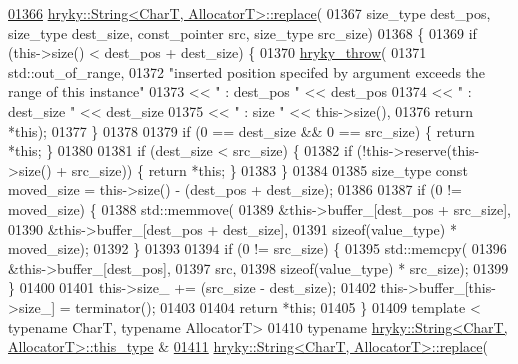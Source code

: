 \begin{DoxyCode}
\hypertarget{string_8h_source_l01366}{}\hyperlink{classhryky_1_1_string_af903fdf0a575a50bdedda445c31d376e}{01366} \hyperlink{classhryky_1_1_string}{hryky::String<CharT, AllocatorT>::replace}(
01367     size\_type dest\_pos, size\_type dest\_size, const\_pointer src, size\_type 
      src\_size)
01368 \{
01369     \textcolor{keywordflow}{if} (this->size() < dest\_pos + dest\_size) \{
01370         \hyperlink{debug__common_8h_af50606eac4009921527ddcaed392b2c2}{hryky_throw}(
01371             std::out\_of\_range,
01372             \textcolor{stringliteral}{"inserted position specifed by argument exceeds the range of this
       instance"}
01373             << \textcolor{stringliteral}{" : dest\_pos "} << dest\_pos
01374             << \textcolor{stringliteral}{" : dest\_size "} << dest\_size
01375             << \textcolor{stringliteral}{" : size "} << this->size(),
01376             \textcolor{keywordflow}{return} *\textcolor{keyword}{this});
01377     \}
01378 
01379     \textcolor{keywordflow}{if} (0 == dest\_size && 0 == src\_size) \{ \textcolor{keywordflow}{return} *\textcolor{keyword}{this}; \}
01380 
01381     \textcolor{keywordflow}{if} (dest\_size < src\_size) \{
01382         \textcolor{keywordflow}{if} (!this->reserve(this->size() + src\_size)) \{ \textcolor{keywordflow}{return} *\textcolor{keyword}{this}; \}
01383     \}
01384 
01385     size\_type \textcolor{keyword}{const} moved\_size = this->size() - (dest\_pos + dest\_size);
01386 
01387     \textcolor{keywordflow}{if} (0 != moved\_size) \{
01388         std::memmove(
01389             &this->buffer\_[dest\_pos + src\_size],
01390             &this->buffer\_[dest\_pos + dest\_size],
01391             \textcolor{keyword}{sizeof}(value\_type) * moved\_size);
01392     \}
01393 
01394     \textcolor{keywordflow}{if} (0 != src\_size) \{
01395         std::memcpy(
01396             &this->buffer\_[dest\_pos],
01397             src,
01398             \textcolor{keyword}{sizeof}(value\_type) * src\_size);
01399     \}
01400 
01401     this->size\_ += (src\_size - dest\_size);
01402     this->buffer\_[this->size\_] = terminator();
01403 
01404     \textcolor{keywordflow}{return} *\textcolor{keyword}{this};
01405 \}
01409 \textcolor{keyword}{template} < \textcolor{keyword}{typename} CharT, \textcolor{keyword}{typename} AllocatorT>
01410 \textcolor{keyword}{typename} \hyperlink{classhryky_1_1_string}{hryky::String<CharT, AllocatorT>::this_type} &
\hypertarget{string_8h_source_l01411}{}\hyperlink{classhryky_1_1_string_a212bb5e5302c2675650dd4f55878ba25}{01411} \hyperlink{classhryky_1_1_string}{hryky::String<CharT, AllocatorT>::replace}(

\end{DoxyCode}
